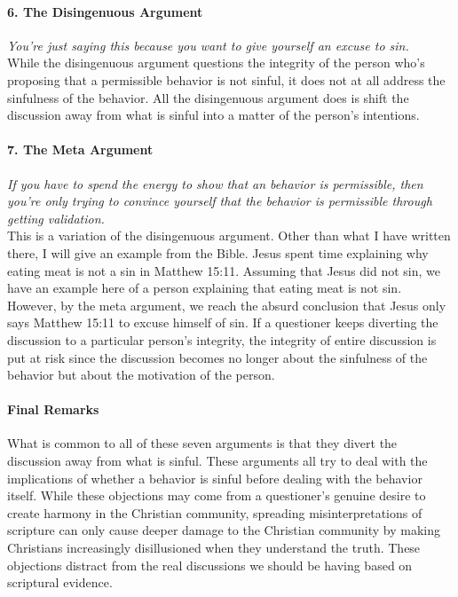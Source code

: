 \documentclass[a4paper, 12pt]{article}
\begin{document}
\paragraph{6. The Disingenuous Argument} \textit{You're just saying this because you want to give yourself an excuse to sin.} \\
While the disingenuous argument questions the integrity of the person who's proposing that a permissible behavior is not sinful, it does not at all address the sinfulness of the behavior. All the disingenuous argument does is shift the discussion away from what is sinful into a matter of the person's intentions. \\
\paragraph{7. The Meta Argument} \textit{If you have to spend the energy to show that an behavior is permissible, then you're only trying to convince yourself that the behavior is permissible through getting validation.} \\
This is a variation of the disingenuous argument. Other than what I have written there, I will give an example from the Bible. Jesus spent time explaining why eating meat is not a sin in Matthew 15:11. Assuming that Jesus did not sin, we have an example here of a person explaining that eating meat is not sin. However, by the meta argument, we reach the absurd conclusion that Jesus only says Matthew 15:11 to excuse himself of sin. If a questioner keeps diverting the discussion to a particular person's integrity, the integrity of entire discussion is put at risk since the discussion becomes no longer about the sinfulness of the behavior but about the motivation of the person. \\
\paragraph{Final Remarks} What is common to all of these seven arguments is that they divert the discussion away from what is sinful. These arguments all try to deal with the implications of whether a behavior is sinful before dealing with the behavior itself. While these objections may come from a questioner's genuine desire to create harmony in the Christian community, spreading misinterpretations of scripture can only cause deeper damage to the Christian community by making Christians increasingly disillusioned when they understand the truth. These objections distract from the real discussions we should be having based on scriptural evidence. \\
\pagebreak
\end{document}
